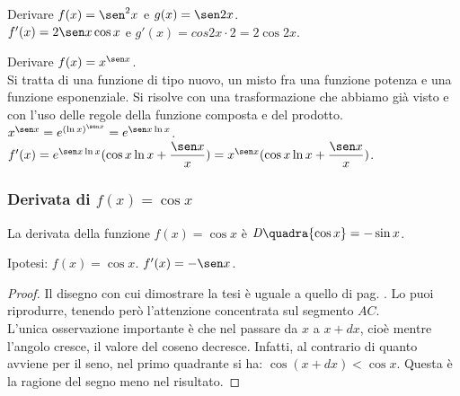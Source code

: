 \begin{esempio}
Derivare $f(x)=\sen^2 x$ e $g(x)= \sen 2x$.\\
$f'(x)=2\sen x \cos x$ e $g'(x)=cos 2x\cdot 2= 2 \cos 2x$.
\end{esempio}

\begin{esempio}
  Derivare $f(x)=x^{\sen x}$.\\
  Si tratta di una funzione di tipo nuovo, un misto fra una funzione potenza
  e una funzione esponenziale. Si risolve con una trasformazione che abbiamo
  già visto e con l'uso delle regole della funzione composta e del 
prodotto.\\
  $x^{\sen x}=e^{{(\ln x)}^{\sen x}}=e^{\sen x\ln x}$.\\
  $f'(x)=e^{\sen x\ln x}(\cos x \ln x +\dfrac{\sen x}{x})=
  x^{\sen x}(\cos x \ln x +\dfrac{\sen x}{x})$.
\end{esempio}

 \subsubsection{Derivata di $f(x)=\cos x$}
\begin{teorema}
  La derivata della funzione $f(x)=\cos x$ è $\mathit{D}\quadra{\cos x}=
  -\sin x$.
\end{teorema}
\noindent Ipotesi: $f(x)=\cos x$. \tab $f'(x)=-\sen x$.
\begin{proof}
  Il disegno con cui dimostrare la tesi è uguale a quello di pag.
  \pageref{fig_diff01dseno}. Lo puoi riprodurre, tenendo però l'attenzione
  concentrata sul segmento $AC$.\\
L'unica osservazione importante è che nel passare da $x$ a $ x+dx$, cioè 
mentre
l'angolo cresce, il valore del coseno decresce. Infatti, al contrario di 
quanto
avviene per il seno, nel primo quadrante si ha: $ \cos(x+dx)<\cos x$. 
Questa è 
la ragione del segno meno nel risultato.
\end{proof}

\begin{inaccessibleblock}
  \begin{minipage}[]{.47\textwidth}
    \begin{center} \coseno \end{center}
 \end{minipage} 
  \hfill
 \begin{minipage}[]{.47\textwidth}
 \begin{center} \tangenticoseno \end{center}
 \end{minipage}
\end{inaccessibleblock}
\label{}

